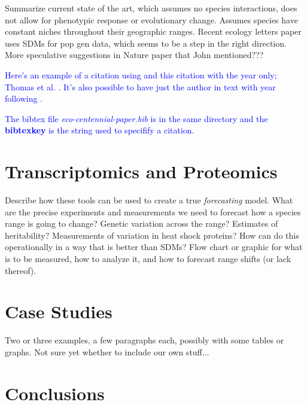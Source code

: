 \documentclass{article}
\newcommand{\Jtxt}[1]{\textcolor{blue}{#1}}
\begin{document}
Summarize current state of the art, which assumes no species interactions, does not allow for phenotypic response or evolutionary change. Assumes species have constant niches throughout their geographic ranges. Recent ecology letters paper uses SDMs for pop gen data, which seems to be a step in the right direction. More speculative suggestions in Nature paper that John mentioned???

\Jtxt{Here's an example of a citation using \parencite{ettinger_climate_2013} and this citation with the year only; Thomas et al. \parencite*{thomas_extinction_2004}. It's also possible to have just the author in text with year following   \textcite{aitken_assisted_2013}. }

 \Jtxt{The bibtex file \emph{eco-centennial-paper.bib} is in the same directory and the \textbf{bibtexkey} is the string used to specifify a citation.}

\section*{Transcriptomics and Proteomics}
Describe how these tools can be used to create a true \emph{forecasting} model. What are the precise experiments and measurements we need to forecast how a species range is going to change? Genetic variation across the range? Estimates of heritability? Measurements of variation in heat shock proteins? How can do this operationally in a way that is better than SDMs? Flow chart or graphic for what is to be measured, how to analyze it, and how to forecast range shifts (or lack thereof).

\section*{Case Studies}
Two or three examples, a few paragraphs each, possibly with some tables or graphs. Not sure yet whether to include our own stuff...

\section*{Conclusions}

\printbibliography
\end{document}
